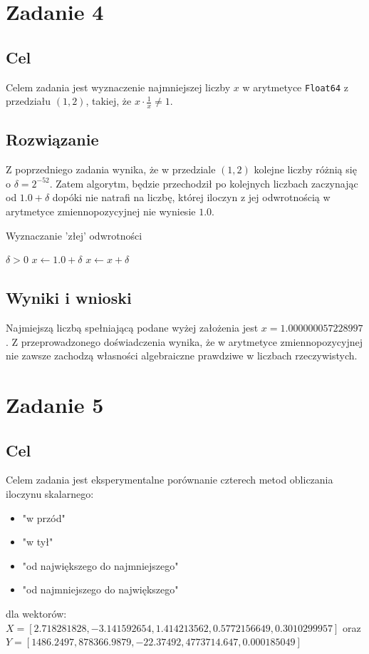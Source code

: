 \documentclass{article}
\begin{document}
\section{Zadanie 4}
\subsection{Cel}
Celem zadania jest wyznaczenie najmniejszej liczby $x$ w arytmetyce \texttt{Float64} z przedziału $(1, 2)$, takiej, że $x \cdot \frac{1}{x} \neq 1$.
\subsection{Rozwiązanie}
Z poprzedniego zadania wynika, że w przedziale $(1, 2)$ kolejne liczby różnią się o $\delta = 2^{-52}$. Zatem algorytm, będzie przechodził po kolejnych liczbach zaczynając od $1.0 + \delta$ dopóki nie natrafi na liczbę, której iloczyn \newline z jej odwrotnością w arytmetyce zmiennopozycyjnej nie wyniesie $1.0$.

\begin{algorithm}[h!]
    \caption{Wyznaczanie 'złej' odwrotności}
    \begin{algorithmic}
        \Require $\delta > 0$
        \State $x \gets 1.0 + \delta$
            \State $x \gets x + \delta$
        \EndWhile
    \end{algorithmic}
\end{algorithm}


\subsection{Wyniki i wnioski}
Najmiejszą liczbą spełniającą podane wyżej założenia jest $x = 1.000000057228997$. \newline
Z przeprowadzonego doświadczenia wynika, że w arytmetyce zmiennopozycyjnej nie zawsze zachodzą własności algebraiczne prawdziwe w liczbach rzeczywistych.

\section{Zadanie 5}
\subsection{Cel}
Celem zadania jest eksperymentalne porównanie czterech metod obliczania iloczynu skalarnego:
\begin{itemize}
    \item "w przód"
    \item "w tył"
    \item "od największego do najmniejszego"
    \item "od najmniejszego do największego"
\end{itemize}
dla wektorów: \newline $X = [2.718281828, -3.141592654, 1.414213562, 0.5772156649, 0.3010299957]$ oraz \newline $Y = [1486.2497, 878366.9879, -22.37492, 4773714.647, 0.000185049]$
\end{document}
